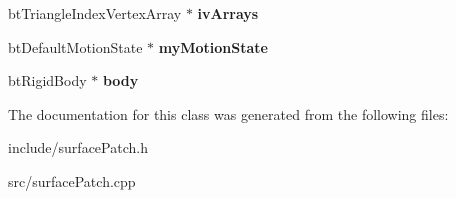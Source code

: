 \begin{DoxyCompactItemize}
\item 
\hypertarget{classSurfacePatch_a954006da7910a7b7ba2b13648743312d}{
bt\-Triangle\-Index\-Vertex\-Array $\ast$ {\bfseries iv\-Arrays}}
\label{d4/d37/classSurfacePatch_a954006da7910a7b7ba2b13648743312d}

\item 
\hypertarget{classSurfacePatch_a70d0faa8bc69713815998d77bf16e202}{
bt\-Default\-Motion\-State $\ast$ {\bfseries my\-Motion\-State}}
\label{d4/d37/classSurfacePatch_a70d0faa8bc69713815998d77bf16e202}

\item 
\hypertarget{classSurfacePatch_a637093a1665e7de7ecb096ddb045839e}{
bt\-Rigid\-Body $\ast$ {\bfseries body}}
\label{d4/d37/classSurfacePatch_a637093a1665e7de7ecb096ddb045839e}

\end{DoxyCompactItemize}


\-The documentation for this class was generated from the following files\-:\begin{DoxyCompactItemize}
\item 
include/surface\-Patch.\-h\item 
src/surface\-Patch.\-cpp\end{DoxyCompactItemize}
